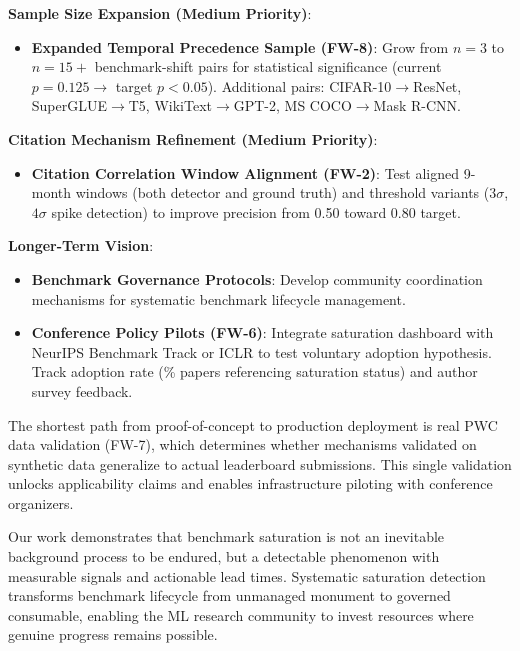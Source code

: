 \textbf{Sample Size Expansion (Medium Priority)}:
\begin{itemize}
\item \textbf{Expanded Temporal Precedence Sample (FW-8)}: Grow from $n=3$ to $n=15+$ benchmark-shift pairs for statistical significance (current $p=0.125 \rightarrow$ target $p<0.05$). Additional pairs: CIFAR-10$\rightarrow$ResNet, SuperGLUE$\rightarrow$T5, WikiText$\rightarrow$GPT-2, MS COCO$\rightarrow$Mask R-CNN.
\end{itemize}

\textbf{Citation Mechanism Refinement (Medium Priority)}:
\begin{itemize}
\item \textbf{Citation Correlation Window Alignment (FW-2)}: Test aligned 9-month windows (both detector and ground truth) and threshold variants ($3\sigma$, $4\sigma$ spike detection) to improve precision from 0.50 toward 0.80 target.
\end{itemize}

\textbf{Longer-Term Vision}:
\begin{itemize}
\item \textbf{Benchmark Governance Protocols}: Develop community coordination mechanisms for systematic benchmark lifecycle management.
\item \textbf{Conference Policy Pilots (FW-6)}: Integrate saturation dashboard with NeurIPS Benchmark Track or ICLR to test voluntary adoption hypothesis. Track adoption rate (\% papers referencing saturation status) and author survey feedback.
\end{itemize}

The shortest path from proof-of-concept to production deployment is real PWC data validation (FW-7), which determines whether mechanisms validated on synthetic data generalize to actual leaderboard submissions. This single validation unlocks applicability claims and enables infrastructure piloting with conference organizers.

Our work demonstrates that benchmark saturation is not an inevitable background process to be endured, but a detectable phenomenon with measurable signals and actionable lead times. Systematic saturation detection transforms benchmark lifecycle from unmanaged monument to governed consumable, enabling the ML research community to invest resources where genuine progress remains possible.
